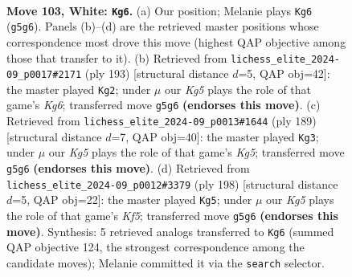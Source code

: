 \documentclass[11pt]{article}
\begin{document}
\clearpage

\begin{figure}[p]\centering
\begin{subfigure}{0.46\textwidth}\centering
\resizebox{\linewidth}{!}{%
\newchessgame
\chessboard[
  setfen={8/8/3k4/6K1/8/1N6/2R3Pr/8 w - - 70 103},
  showmover=false,
  pgfstyle=straightmove, color=movearrow, markmove={g5-g6}
]}
\caption{}
\end{subfigure}\hfill
\begin{subfigure}{0.46\textwidth}\centering
\resizebox{\linewidth}{!}{%
\newchessgame
\chessboard[
  setfen={8/8/8/7r/2K5/6k1/7p/7R b - - 3 97},
  showmover=false,
  pgfstyle=straightmove, color=movearrow, markmove={g3-g2}
]}
\caption{}
\end{subfigure}
\\[4pt]
\begin{subfigure}{0.46\textwidth}\centering
\resizebox{\linewidth}{!}{%
\newchessgame
\chessboard[
  setfen={8/8/8/3K4/6k1/7r/7p/7R b - - 4 95},
  showmover=false,
  pgfstyle=straightmove, color=movearrow, markmove={g4-g3}
]}
\caption{}
\end{subfigure}\hfill
\begin{subfigure}{0.46\textwidth}\centering
\resizebox{\linewidth}{!}{%
\newchessgame
\chessboard[
  setfen={5k2/1R5P/7r/5K2/8/8/8/8 w - - 29 100},
  showmover=false,
  pgfstyle=straightmove, color=movearrow, markmove={f5-g5}
]}
\caption{}
\end{subfigure}
\caption{\textbf{Move 103, White: \texttt{Kg6}.} (a) Our position; Melanie plays \texttt{Kg6} (\texttt{g5g6}). Panels (b)--(d) are the retrieved master positions whose correspondence most drove this move (highest QAP objective among those that transfer to it). (b) Retrieved from \texttt{lichess\_elite\_2024-09\_p0017\#2171} (ply 193) [structural distance $d$=5, QAP obj=42]: the master played \texttt{Kg2}; under $\mu$ our \emph{Kg5} plays the role of that game's \emph{Kg6}; transferred move \texttt{g5g6} \textbf{(endorses this move)}. (c) Retrieved from \texttt{lichess\_elite\_2024-09\_p0013\#1644} (ply 189) [structural distance $d$=7, QAP obj=40]: the master played \texttt{Kg3}; under $\mu$ our \emph{Kg5} plays the role of that game's \emph{Kg5}; transferred move \texttt{g5g6} \textbf{(endorses this move)}. (d) Retrieved from \texttt{lichess\_elite\_2024-09\_p0012\#3379} (ply 198) [structural distance $d$=5, QAP obj=22]: the master played \texttt{Kg5}; under $\mu$ our \emph{Kg5} plays the role of that game's \emph{Kf5}; transferred move \texttt{g5g6} \textbf{(endorses this move)}. Synthesis: 5 retrieved analogs transferred to \texttt{Kg6} (summed QAP objective 124, the strongest correspondence among the candidate moves); Melanie committed it via the \texttt{search} selector.}
\label{fig:thought-m204}
\end{figure}
\end{document}
